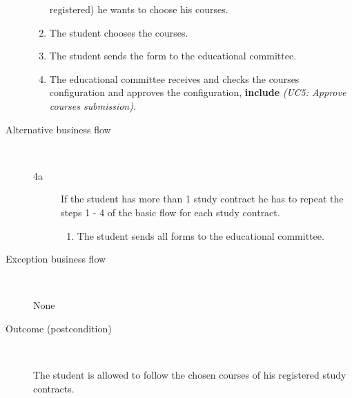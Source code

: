 \begin{description}
\begin{enumerate}
	  	registered) he wants to choose his courses.
	  	\item The student chooses the courses.
	  	\item The student sends the form to the educational committee.
	  	\item The educational committee receives and checks the courses
	  	configuration and approves the configuration, \textbf{include} \emph{(UC5:
	  	Approve courses submission)}.
	\end{enumerate}
	\item[Alternative business flow] \
	\begin{description}
		\item[4a]If the student has more than 1 study contract he has to
		repeat the steps 1 - 4 of the basic flow for each study contract.
			\begin{enumerate} 
	  			\item The student sends all forms to the educational committee.
			\end{enumerate}
	\end{description}
	\item[Exception business flow] \ 
	\par None
	\item[Outcome (postcondition)] \  
		\par The student is allowed to follow the chosen courses of his registered
		study contracts.
\end{description}
